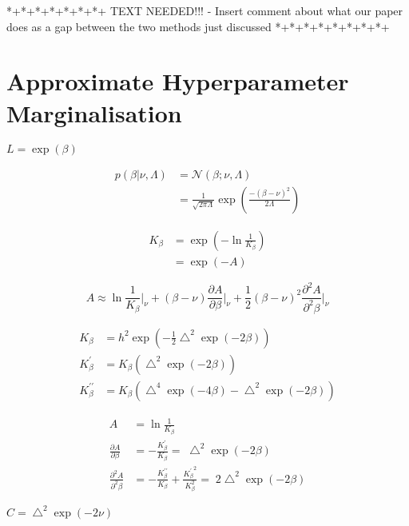 \documentclass{article}
\begin{document}
*+*+*+*+*+*+*+ TEXT NEEDED!!! - Insert comment about what our paper does as a gap between the two methods just discussed *+*+*+*+*+*+*+*+

\section{Approximate Hyperparameter Marginalisation}

$L = \exp(\beta)$

\begin{align}
p(\beta|\nu,\Lambda) &= \mathcal{N}(\beta; \nu, \Lambda)\\
&= \frac{1}{\sqrt{2 \pi \Lambda}} \exp \left( \frac{ -(\beta - \nu)^2}{2\Lambda} \right)
\end{align}

\begin{align}
K_\beta &= \exp \left( -\ln \frac{1}{K_\beta} \right)\\ 
&= \exp \left( -A \right)
\end{align}


\begin{equation} \label{taylorexpansion}
A \approx \ln \frac{1}{K_{\beta}}\bigg|_{\nu} + (\beta-\nu) \frac{\partial{A}}{\partial{\beta}}\bigg|_{\nu} + \frac{1}{2}(\beta-\nu)^2 \frac{\partial^2{A}}{\partial^2{\beta}}\bigg|_{\nu}
\end{equation}

\begin{align}%
K_\beta &= h^2 \exp\left( -\frac{1}{2}\bigtriangleup^2 \exp(-2\beta) \right)\\
K^\prime_\beta &= K_\beta \left( \bigtriangleup^2 \exp(-2\beta)  \right) \\
K^{\prime\prime}_\beta &= K_\beta \left( \bigtriangleup^4 \exp(-4\beta) -  \bigtriangleup^2 \exp(-2\beta) \right)
\end{align}

\begin{align}
A &= \ln \frac{1}{K_\beta} \\
\frac{\partial{A}}{\partial{\beta}} &= -\frac{K^\prime_\beta}{K_\beta} = \; \bigtriangleup^2 \exp(-2\beta)\\
\frac{\partial^2{A}}{\partial^2{\beta}} &= -\frac{K^{\prime\prime}_\beta}{K_\beta} + \frac{{K^\prime_\beta}^2}{K_\beta^2} = \; 2 \bigtriangleup^2 \exp(-2\beta)
\end{align}

$C = \bigtriangleup^2 \exp(-2\nu)$
\end{document}
